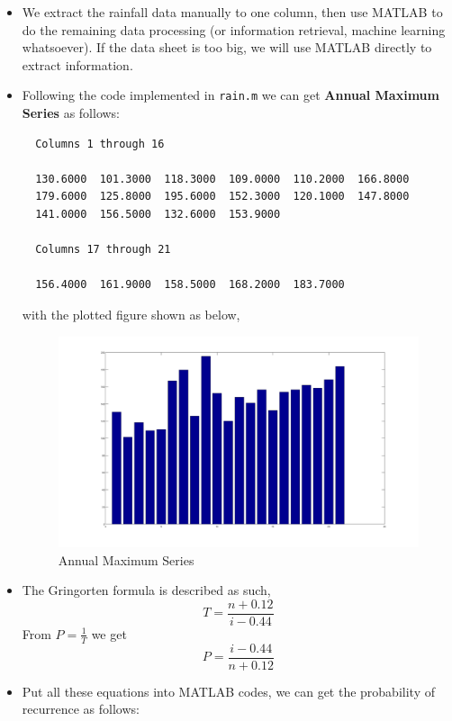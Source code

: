 \documentclass[12pt]{article}
\begin{document}
\begin{itemize}
\item We extract the rainfall data manually to one column, then use
  MATLAB to do the remaining data processing (or information
  retrieval, machine learning whatsoever). If the data sheet is too
  big, we will use MATLAB directly to extract information.
\item Following the code implemented in \texttt{rain.m} we can get
  \textbf{Annual Maximum Series} as follows:
\begin{verbatim}
  Columns 1 through 16

  130.6000  101.3000  118.3000  109.0000  110.2000  166.8000
  179.6000  125.8000  195.6000  152.3000  120.1000  147.8000
  141.0000  156.5000  132.6000  153.9000

  Columns 17 through 21

  156.4000  161.9000  158.5000  168.2000  183.7000
\end{verbatim}
  with the plotted figure shown as below,
  \begin{figure}
    \centering
    \includegraphics[scale=0.30]{annums_bar.png}
    \caption{Annual Maximum Series}
    \label{fig:rain-ams}
  \end{figure}

\item The Gringorten formula is described as such,
  \begin{equation}
    \label{eq:6}
    T=\frac{n+0.12}{i-0.44}
  \end{equation}
  From $P=\frac{1}{T}$ we get
  \begin{equation}
    \label{eq:13}
    P=\frac{i-0.44}{n+0.12}
  \end{equation}
\item Put all these equations into MATLAB codes, we can get the
  probability of recurrence as follows:
\begin{verbatim}


\end{verbatim}
\end{itemize}
\end{document}
